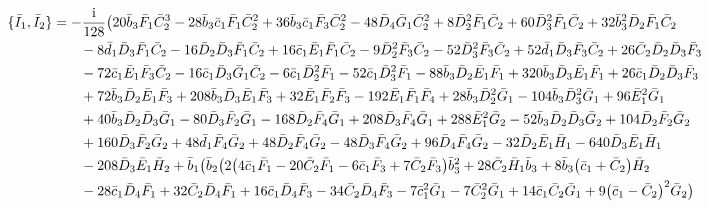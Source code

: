 \documentclass[10pt]{amsart}
\theoremstyle{definition}
\theoremstyle{corollary}
\theoremstyle{remark}
\theoremstyle{conclusion}
\begin{document}
\begin{align}
\{\bar{I}_1, \bar{I}_2\}&=-\frac{{\rm i}}{128} \bigl(20 \bar{b}_3 \bar{F}_1 \bar{C}_2^3-28 \bar{b}_3 \bar{c}_1 \bar{F}_1 \bar{C}_2^2+36 \bar{b}_3 \bar{c}_1 \bar{F}_3 \bar{C}_2^2-48 \bar{D}_4 \bar{G}_1 \bar{C}_2^2+8 \bar{D}_2^2 \bar{F}_1 \bar{C}_2+60 \bar{D}_3^2 \bar{F}_1 \bar{C}_2+32 \bar{b}_3^2 \bar{D}_2 \bar{F}_1 \bar{C}_2\nonumber \\
& \hskip 0.7cm-8 \bar{d}_1 \bar{D}_3 \bar{F}_1 \bar{C}_2-16 \bar{D}_2 \bar{D}_3 \bar{F}_1 \bar{C}_2+16 \bar{c}_1 \bar{E}_1 \bar{F}_1 \bar{C}_2-9 \bar{D}_2^2 \bar{F}_3 \bar{C}_2-52 \bar{D}_3^2 \bar{F}_3 \bar{C}_2+52 \bar{d}_1 \bar{D}_3 \bar{F}_3 \bar{C}_2+26 \bar{C}_2\bar{D}_2 \bar{D}_3 \bar{F}_3\nonumber  \\
& \hskip 0.7cm-72 \bar{c}_1 \bar{E}_1 \bar{F}_3 \bar{C}_2-16 \bar{c}_1 \bar{D}_3 \bar{G}_1 \bar{C}_2-6 \bar{c}_1 \bar{D}_2^2 \bar{F}_1-52 \bar{c}_1 \bar{D}_3^2 \bar{F}_1-88 \bar{b}_3 \bar{D}_2 \bar{E}_1 \bar{F}_1+320 \bar{b}_3 \bar{D}_3 \bar{E}_1 \bar{F}_1+26 \bar{c}_1 \bar{D}_2 \bar{D}_3 \bar{F}_3 \nonumber \\
& \hskip 0.7cm+72 \bar{b}_3 \bar{D}_2 \bar{E}_1 \bar{F}_3+208 \bar{b}_3 \bar{D}_3 \bar{E}_1 \bar{F}_3+32 \bar{E}_1 \bar{F}_2 \bar{F}_3-192 \bar{E}_1 \bar{F}_1 \bar{F}_4+28 \bar{b}_3 \bar{D}_2^2 \bar{G}_1-104 \bar{b}_3 \bar{D}_3^2 \bar{G}_1+96 \bar{E}_1^2 \bar{G}_1 \nonumber \\
& \hskip 0.7cm+40 \bar{b}_3 \bar{D}_2 \bar{D}_3 \bar{G}_1-80 \bar{D}_3 \bar{F}_2 \bar{G}_1-168 \bar{D}_2 \bar{F}_4 \bar{G}_1+208 \bar{D}_3 \bar{F}_4 \bar{G}_1+288 \bar{E}_1^2 \bar{G}_2-52 \bar{b}_3 \bar{D}_2 \bar{D}_3 \bar{G}_2+104 \bar{D}_2 \bar{F}_2 \bar{G}_2 \nonumber \\
& \hskip 0.7cm+160 \bar{D}_3 \bar{F}_2 \bar{G}_2+48 \bar{d}_1 \bar{F}_4 \bar{G}_2+48 \bar{D}_2 \bar{F}_4 \bar{G}_2-48 \bar{D}_3 \bar{F}_4 \bar{G}_2+96 \bar{D}_4 \bar{F}_4 \bar{G}_2-32 \bar{D}_2 \bar{E}_1 \bar{H}_1-640 \bar{D}_3 \bar{E}_1 \bar{H}_1 \nonumber \\
& \hskip 0.7cm-208 \bar{D}_3 \bar{E}_1 \bar{H}_2+\bar{b}_1 \bigl(\bar{b}_2 \bigl(2 \bigl(4 \bar{c}_1 \bar{F}_1-20 \bar{C}_2 \bar{F}_1-6 \bar{c}_1 \bar{F}_3+7 \bar{C}_2 \bar{F}_3\bigl) \bar{b}_3^2+28 \bar{C}_2 \bar{H}_1 \bar{b}_3+8  \bar{b}_3\bigl(\bar{c}_1+\bar{C}_2\bigl) \bar{H}_2 \nonumber \\
& \hskip 0.7cm-28 \bar{c}_1 \bar{D}_4 \bar{F}_1+32 \bar{C}_2 \bar{D}_4 \bar{F}_1+16 \bar{c}_1 \bar{D}_4 \bar{F}_3-34 \bar{C}_2 \bar{D}_4 \bar{F}_3-7 \bar{c}_1^2 \bar{G}_1-7 \bar{C}_2^2 \bar{G}_1+14 \bar{c}_1 \bar{C}_2 \bar{G}_1+9 \bigl(\bar{c}_1-\bar{C}_2\bigl)^2 \bar{G}_2\bigl)\nonumber \\

\end{align}
\end{document}
